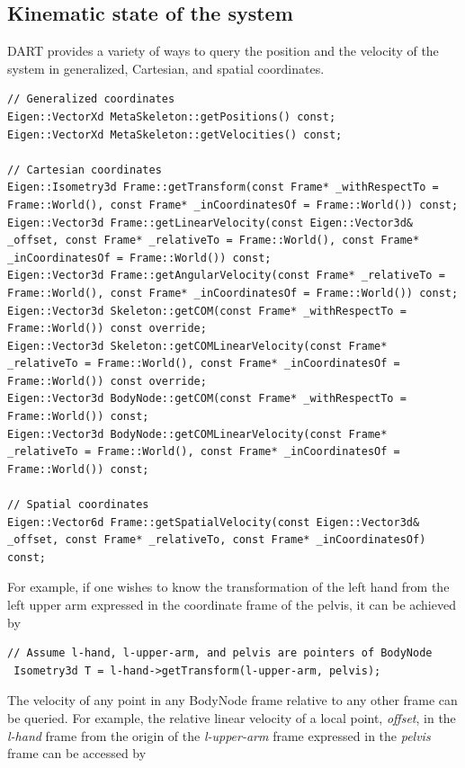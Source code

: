 \subsection{Kinematic state of the system}
DART provides a variety of ways to query the position and the velocity of the system in generalized, Cartesian, and spatial coordinates. 

\begin{lstlisting}
// Generalized coordinates
Eigen::VectorXd MetaSkeleton::getPositions() const;
Eigen::VectorXd MetaSkeleton::getVelocities() const;

// Cartesian coordinates
Eigen::Isometry3d Frame::getTransform(const Frame* _withRespectTo = Frame::World(), const Frame* _inCoordinatesOf = Frame::World()) const;
Eigen::Vector3d Frame::getLinearVelocity(const Eigen::Vector3d& _offset, const Frame* _relativeTo = Frame::World(), const Frame* _inCoordinatesOf = Frame::World()) const;
Eigen::Vector3d Frame::getAngularVelocity(const Frame* _relativeTo = Frame::World(), const Frame* _inCoordinatesOf = Frame::World()) const;
Eigen::Vector3d Skeleton::getCOM(const Frame* _withRespectTo = Frame::World()) const override;
Eigen::Vector3d Skeleton::getCOMLinearVelocity(const Frame* _relativeTo = Frame::World(), const Frame* _inCoordinatesOf = Frame::World()) const override;
Eigen::Vector3d BodyNode::getCOM(const Frame* _withRespectTo = Frame::World()) const;
Eigen::Vector3d BodyNode::getCOMLinearVelocity(const Frame* _relativeTo = Frame::World(), const Frame* _inCoordinatesOf = Frame::World()) const;

// Spatial coordinates
Eigen::Vector6d Frame::getSpatialVelocity(const Eigen::Vector3d& _offset, const Frame* _relativeTo, const Frame* _inCoordinatesOf) const;
\end{lstlisting}

For  example, if one wishes to know the transformation of the left
hand from the left upper arm expressed in the coordinate frame of the
pelvis, it can be achieved by 

\begin{lstlisting}
// Assume l-hand, l-upper-arm, and pelvis are pointers of BodyNode
 Isometry3d T = l-hand->getTransform(l-upper-arm, pelvis);
\end{lstlisting}

The velocity of any point in any BodyNode frame relative to any other
frame can be queried. For example, the relative linear velocity of a
local point, \emph{offset}, in the \emph{l-hand} frame from the origin of the \emph{l-upper-arm} frame expressed in the \emph{pelvis} frame can be accessed by

